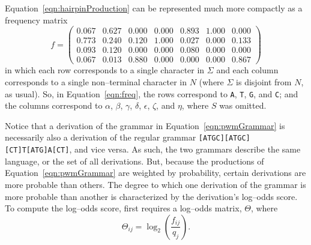     Equation~\ref{eqn:hairpinProduction} can be represented much
    more compactly as a frequency matrix
    \begin{equation}\label{eqn:freq}
    f=
        \begin{pmatrix}
0.067 & 0.627 & 0.000 & 0.000 & 0.893 & 1.000 & 0.000 \\
0.773 & 0.240 & 0.120 & 1.000 & 0.027 & 0.000 & 0.133 \\
0.093 & 0.120 & 0.000 & 0.000 & 0.080 & 0.000 & 0.000 \\
0.067 & 0.013 & 0.880 & 0.000 & 0.000 & 0.000 & 0.867
        \end{pmatrix}
    \end{equation}
    in which each row corresponds to a single character in
    $\Sigma$ and each column corresponds to a single non--terminal
    character in  $N$ (where $\Sigma$ is disjoint from $N$, as
    usual).  So, in Equation~\ref{eqn:freq}, the rows correspond to
    \texttt{A}, \texttt{T}, \texttt{G}, and \texttt{C}; and the columns
    correspond to $\alpha$, $\beta$, $\gamma$, $\delta$, $\epsilon$, $\zeta$, and
    $\eta$, where $S$ was omitted.

    Notice that a derivation of the grammar in Equation~\vref{eqn:pwmGrammar}
    is necessarily also a derivation of the regular grammar
    \texttt{[ATGC][ATGC][CT]T[ATG]A[CT]}, and vice versa.  As such, the two grammars
    describe the same language, or the set of all derivations.  But,
    because the productions of Equation~\ref{eqn:pwmGrammar} are
    weighted by probability, certain derivations are more probable
    than others.  The degree to which one derivation of the grammar
    is more probable than another is characterized by the
    derivation's log--odds score.  To compute the log--odds score,
    first requires a log--odds matrix, $\Theta$, where
\begin{equation}\label{eqn:theta}
    \Theta_{ij} = \log_2 \left(\frac{f_{ij}}{q_j}\right).
\end{equation}


